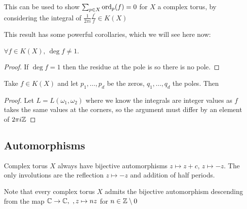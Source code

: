 \documentclass{article}
\begin{document}
\begin{remark}
	This can be used to show $\sum_{p\in X} \operatorname{ord}_p(f)=0$ for $X$ a complex torus, by considering the integral of $\frac{1}{2\pi i}\frac{f^\prime}{f} \in K(X)$
\end{remark}

This result has some powerful corollaries, which we will see here now:

\begin{prop}
	$\forall f \in K(X), \, \deg f \neq 1$.
\end{prop}
\begin{proof}
	If $\deg f = 1$ then the residue at the pole is 
	so there is no pole. 
\end{proof}

\begin{prop}
	Take $f \in K(X)$ and let $p_1, \dots, p_d$ be the zeros, $q_1, \dots, q_d$ the poles. Then 
\end{prop}
\begin{proof}
	Let $L = L(\omega_1, \omega_2)$
	where we know the integrals are integer values as $f$ takes the same values at the corners, so the argument must differ by an element of $2\pi i \mathbb{Z}$
\end{proof}

\subsection{Automorphisms}

\begin{prop}
	Complex torus $X$ always have bijective automorphisms $z \mapsto z+c, \, z \mapsto -z$. The only involutions are the reflection $z \mapsto -z$ and addition of half periods. 
\end{prop}

\begin{remark}
	Note that every complex torus $X$ admits the bijective automorphism descending from the map $\mathbb{C} \to \mathbb{C}, \ ,z \mapsto n z$ for $n \in \mathbb{Z}\setminus 0$
\end{remark}
\end{document}
